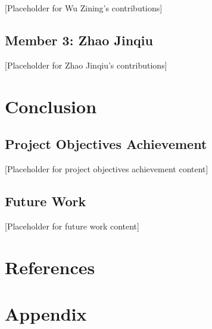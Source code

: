 \documentclass[12pt,a4paper]{article}
\begin{document}

[Placeholder for Wu Zining's contributions]

\subsection{Member 3: Zhao Jinqiu}


[Placeholder for Zhao Jinqiu's contributions]

\section{Conclusion}


\subsection{Project Objectives Achievement}


[Placeholder for project objectives achievement content]

\subsection{Future Work}


[Placeholder for future work content]

\section{References}

\printbibliography

\section{Appendix}
\end{document}
